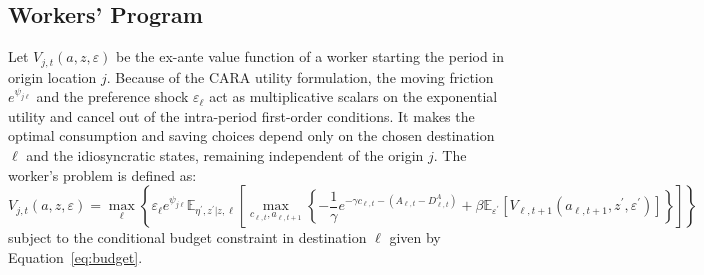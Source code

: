 \documentclass[11pt, a4paper]{article}
\begin{document}
\subsection{Workers' Program}
\label{sec:workers_program}
Let $V_{j,t}(a, z, \varepsilon)$ be the ex-ante value function of a worker starting the period in origin location $j$. Because of the CARA utility formulation, the moving friction $e^{\psi_{j\ell}}$ and the preference shock $\varepsilon_\ell$ act as multiplicative scalars on the exponential utility and cancel out of the intra-period first-order conditions. It makes the optimal consumption and saving choices depend only on the chosen destination $\ell$ and the idiosyncratic states, remaining independent of the origin $j$. The worker's problem is defined as:
\begin{equation}
V_{j,t}(a, z, \varepsilon) = \max_{\ell} \left\{ \varepsilon_\ell e^{\psi_{j\ell}} \mathbb{E}_{\eta^\prime, z^\prime | z, \ell} \left[ \max_{c_{\ell,t}, a_{\ell,t+1}} \left\{ -\frac{1}{\gamma} e^{-\gamma c_{\ell,t} - (A_{\ell,t} - D^A_{\ell,t})} + \beta \mathbb{E}_{\varepsilon^\prime} \left[ V_{\ell,t+1}(a_{\ell,t+1}, z^\prime, \varepsilon^\prime) \right] \right\} \right] \right\}
\end{equation}
subject to the conditional budget constraint in destination $\ell$ given by Equation~\eqref{eq:budget}.
\end{document}
